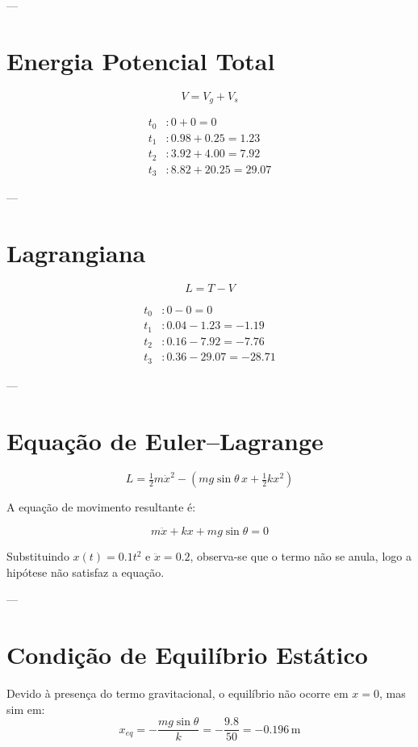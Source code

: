 \documentclass[a4paper,12pt]{article}
\begin{document}
---

\section*{Energia Potencial Total}

\[
V = V_g + V_s
\]

\begin{align*}
t_0 &: 0 + 0 = 0 \\
t_1 &: 0.98 + 0.25 = 1.23 \\
t_2 &: 3.92 + 4.00 = 7.92 \\
t_3 &: 8.82 + 20.25 = 29.07
\end{align*}

---

\section*{Lagrangiana}

\[
L = T - V
\]

\begin{align*}
t_0 &: 0 - 0 = 0 \\
t_1 &: 0.04 - 1.23 = -1.19 \\
t_2 &: 0.16 - 7.92 = -7.76 \\
t_3 &: 0.36 - 29.07 = -28.71
\end{align*}

---

\section*{Equação de Euler–Lagrange}

\[
L = \tfrac{1}{2}m\dot{x}^2 - \left(m g \sin\theta\, x + \tfrac{1}{2}k x^2\right)
\]

A equação de movimento resultante é:

\[
m \ddot{x} + kx + m g \sin\theta = 0
\]

Substituindo $x(t) = 0.1t^2$ e $\ddot{x} = 0.2$, observa-se que o termo não se anula, logo a hipótese não satisfaz a equação.

---

\section*{Condição de Equilíbrio Estático}

Devido à presença do termo gravitacional, o equilíbrio não ocorre em $x = 0$, mas sim em:
\[
x_{eq} = - \frac{m g \sin\theta}{k} = -\frac{9.8}{50} = -0.196\,\mathrm{m}
\]
\end{document}
